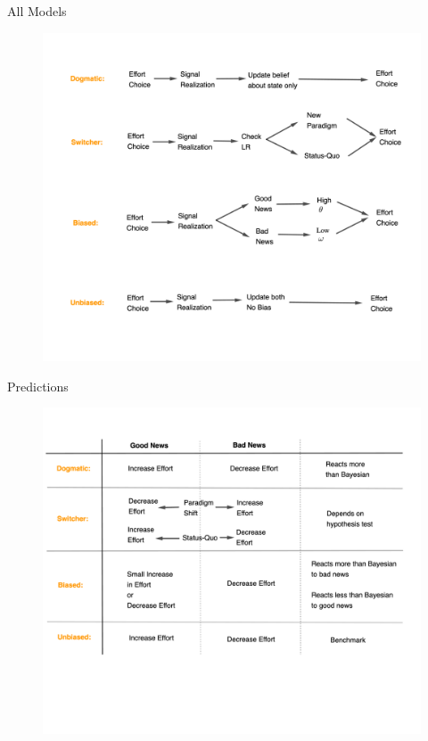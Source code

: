 \documentclass[aspectratio=169]{beamer}
\begin{document}
\begin{frame}{All Models}
    \label{Figure2}
        \begin{figure}
        \centering
        \includegraphics[scale=0.5]{models.png}
    \end{figure}     

\end{frame}

\begin{frame}{Predictions}
    \begin{figure}
        \centering
        \includegraphics[scale=0.5]{predictions.png}
    \end{figure}
\end{frame}
\end{document}
